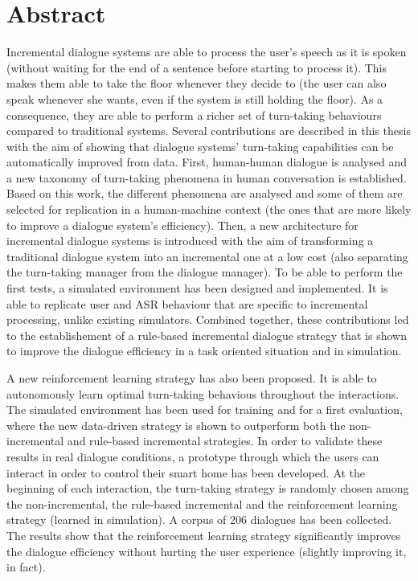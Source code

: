 \chapter*{Abstract}

     Incremental dialogue systems are able to process the user's speech as it is spoken (without waiting for the end of a sentence before starting to process it). This makes them able to take the floor whenever they decide to (the user can also speak whenever she wants, even if the system is still holding the floor). As a consequence, they are able to perform a richer set of turn-taking behaviours compared to traditional systems. Several contributions are described in this thesis with the aim of showing that dialogue systems' turn-taking capabilities can be automatically improved from data. First, human-human dialogue is analysed and a new taxonomy of turn-taking phenomena in human conversation is established. Based on this work, the different phenomena are analysed and some of them are selected for replication in a human-machine context (the ones that are more likely to improve a dialogue system's efficiency). Then, a new architecture for incremental dialogue systems is introduced with the aim of transforming a traditional dialogue system into an incremental one at a low cost (also separating the turn-taking manager from the dialogue manager). To be able to perform the first tests, a simulated environment has been designed and implemented. It is able to replicate user and ASR behaviour that are specific to incremental processing, unlike existing simulators. Combined together, these contributions led to the establishement of a rule-based incremental dialogue strategy that is shown to improve the dialogue efficiency in a task oriented situation and in simulation.

     A new reinforcement learning strategy has also been proposed. It is able to autonomously learn optimal turn-taking behavious throughout the interactions. The simulated environment has been used for training and for a first evaluation, where the new data-driven strategy is shown to outperform both the non-incremental and rule-based incremental strategies. In order to validate these results in real dialogue conditions, a prototype through which the users can interact in order to control their smart home has been developed. At the beginning of each interaction, the turn-taking strategy is randomly chosen among the non-incremental, the rule-based incremental and the reinforcement learning strategy (learned in simulation). A corpus of 206 dialogues has been collected. The results show that the reinforcement learning strategy significantly improves the dialogue efficiency without hurting the user experience (slightly improving it, in fact).
